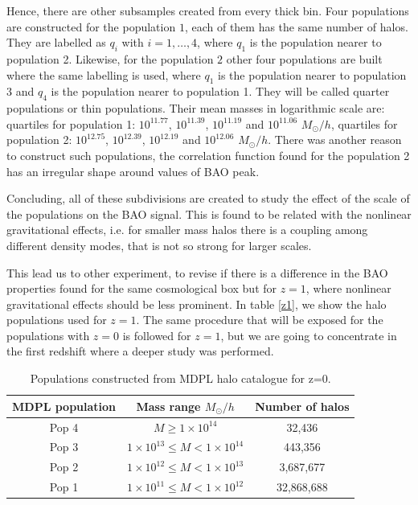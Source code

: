 Hence, there are other subsamples created from every thick bin.
Four populations are constructed for the population $1$,  
each of them has the same number of halos. %
They are labelled as $q_i$ with $i=1,\dots,4$, where $q_1$ is the population
nearer to population 2.
Likewise, for the population $2$ other four populations are built where
the same labelling is used, where $q_1$ is the population nearer to population 3 
and $q_4$ is the population nearer to population 1. They will be called quarter populations or thin
populations. 
Their mean masses in logarithmic scale are: quartiles for population 1: 
$10^{11.77}$, $10^{11.39}$, $10^{11.19}$ and $10^{11.06}$ $M_{\odot}/h$, quartiles for population 2:
$10^{12.75}$, $10^{12.39}$, $10^{12.19}$ and $10^{12.06}$ $M_{\odot}/h$.
There was another reason to construct such populations, the correlation function
found for the population 2 has an irregular shape around values of BAO peak. 
	

Concluding, all of these subdivisions are created to study the effect of the scale of the populations 
on the BAO signal. This is found to be related with the nonlinear gravitational effects, i.e.
for smaller mass halos there is a coupling among different density modes, that is not
so strong for larger scales. 

This lead us to other experiment, to revise if there is a difference in the BAO properties
found for the same cosmological box but for $z=1$, where nonlinear gravitational effects
should be less prominent. In table \ref{z1}, we show the halo populations used 
for $z=1$. The same procedure that will be exposed for the populations with $z=0$ is followed
for $z=1$, but we are going to concentrate in the first redshift where a deeper study 
was performed. 

\begin{table}
\begin{center}
  \begin{tabular}{ | c | c | c | }
    \hline \hline
    MDPL population & Mass range $M_{\odot}/h$& Number of halos \\ \hline \hline
    Pop 4 & $ M \geqslant 1\times 10^{14}$ & 32,436 \\ \hline
    Pop 3 & $ 1\times 10^{13} \leq M < 1\times 10^{14} $ & 443,356\\ \hline
    Pop 2 & $ 1\times 10^{12} \leq M < 1\times 10^{13}$ & 3,687,677\\ \hline
    Pop 1 & $ 1\times 10^{11} \leq M < 1\times 10^{12}$ & 32,868,688 \\ \hline
  \end{tabular}  
   \caption{ Populations constructed from MDPL halo catalogue for z=0. }
\label{pophalos}
\end{center}
\end{table}

